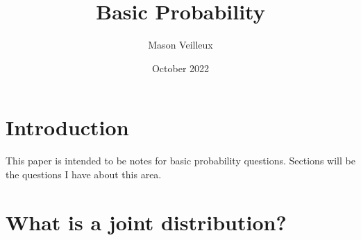 \documentclass{article}
\title{Basic Probability }
\author{Mason Veilleux}
\date{October 2022}
\begin{document}
\maketitle

\section{Introduction}

This paper is intended to be notes for basic probability questions. Sections will be the questions I have about this area.


\section{What is a joint distribution?}
\end{document}
